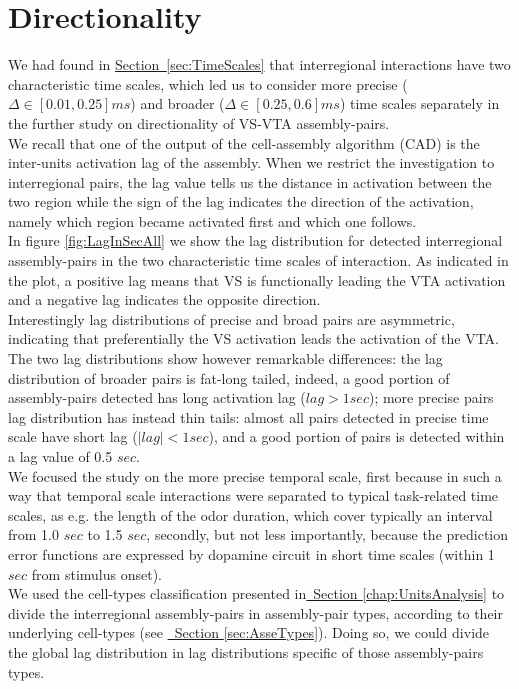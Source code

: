 \section{Directionality} 
\label{sec:Directionality}
We had found in \hyperref[sec:TimeScales]{Section~\ref*{sec:TimeScales}} that interregional interactions have two characteristic time scales, which led us to consider more precise ($\Delta \in [0.01,0.25] ms$) and broader ($\Delta \in [0.25,0.6] ms$) time scales separately in the further study on directionality of VS-VTA assembly-pairs.\\We recall that one of the output of the cell-assembly algorithm (CAD) is the inter-units activation lag of the assembly. When we restrict the investigation to interregional pairs, the lag value tells us the distance in activation between the two region while the sign of the lag indicates the direction of the activation, namely which region became activated first and which one follows.\\In figure \ref{fig:LagInSecAll} we show the lag distribution for detected interregional assembly-pairs in the two characteristic time scales of interaction. As indicated in the plot, a positive lag means that VS is functionally leading the VTA activation and a negative lag indicates the opposite direction.\\Interestingly lag distributions of precise and broad pairs are asymmetric, indicating that preferentially the VS activation leads the activation of the VTA. The two lag distributions show however remarkable differences: the lag distribution of broader pairs is fat-long tailed, indeed, a good portion of assembly-pairs detected has long activation lag ($lag > 1 sec$); more precise pairs lag distribution has instead thin tails: almost all pairs detected in precise time scale have short lag ($|lag| < 1 sec$), and a good portion of pairs is detected within a lag value of 0.5 $sec$.\\
We focused the study on the more precise temporal scale, first because in such a way that temporal scale interactions were separated to typical task-related time scales, as e.g. the length of the odor duration, which cover typically an interval from 1.0 $sec$ to 1.5 $sec$, secondly, but not less importantly, because the prediction error functions are expressed by dopamine circuit in short time scales (within 1 $sec$ from stimulus onset).\\ We used the cell-types classification presented in\hyperref[chap:UnitsAnalysis]{~Section \ref*{chap:UnitsAnalysis}} to divide the interregional assembly-pairs in assembly-pair types, according to their underlying cell-types (see \hyperref[sec:AsseTypes]{~Section \ref*{sec:AsseTypes}}). Doing so, we could divide the global lag distribution in lag distributions specific of those assembly-pairs types.\\
